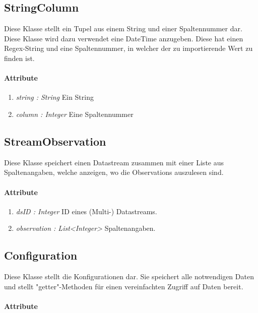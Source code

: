 \subsection{StringColumn}
Diese Klasse stellt ein Tupel aus einem String und einer Spaltennummer dar.
Diese Klasse wird dazu verwendet eine DateTime anzugeben. Diese hat einen Regex-String und eine Spaltennummer, in welcher der zu importierende Wert zu finden ist.
\paragraph{Attribute}
\begin{enumerate}[-]
	\item \textit{string : String} Ein String
	\item \textit{column : Integer} Eine Spaltennummer
\end{enumerate} 

\subsection{StreamObservation}
Diese Klasse speichert einen Datastream zusammen mit einer Liste aus Spaltenangaben, welche anzeigen, wo die Observations auszulesen sind.
\paragraph{Attribute} 
\begin{enumerate}[-]
	\item \textit{dsID : Integer} ID eines (Multi-) Datastreams. 
	\item \textit{observation : List<Integer>} Spaltenangaben.
\end{enumerate}

\subsection{Configuration}
Diese Klasse stellt die Konfigurationen dar. 
Sie speichert alle notwendigen Daten und stellt "{getter}"{-Methoden} für einen vereinfachten Zugriff auf Daten bereit.

\paragraph{Attribute}

